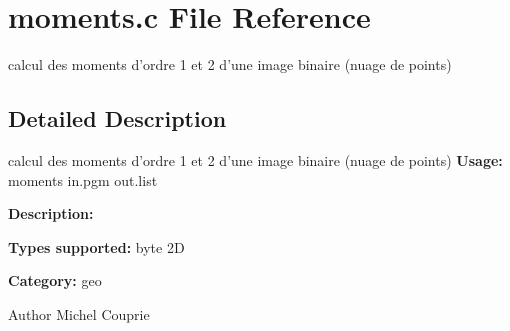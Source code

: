 \section{moments.c File Reference}
\label{moments_8c}


calcul des moments d'ordre 1 et 2 d'une image binaire (nuage de points)  




\subsection{Detailed Description}
calcul des moments d'ordre 1 et 2 d'une image binaire (nuage de points) {\bfseries Usage:} moments in.pgm out.list

{\bfseries Description:}

{\bfseries Types supported:} byte 2D

{\bfseries Category:} geo

\begin{DoxyAuthor}{Author}
Michel Couprie 
\end{DoxyAuthor}
